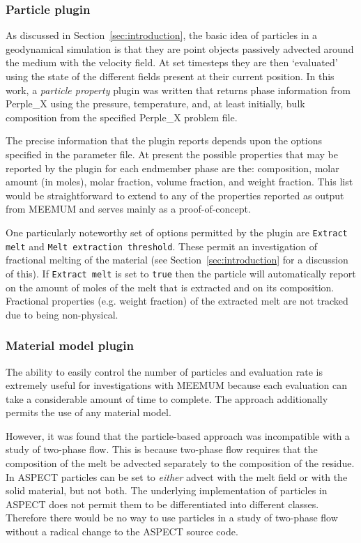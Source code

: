 \subsubsection{Particle plugin}

As discussed in Section~\ref{sec:introduction}, the basic idea of particles in a geodynamical simulation is that they are point objects passively advected around the medium with the velocity field.
At set timesteps they are then `evaluated' using the state of the different fields present at their current position.
In this work, a \textit{particle property} plugin was written that returns phase information from Perple\_X using the pressure, temperature, and, at least initially, bulk composition from the specified Perple\_X problem file.

The precise information that the plugin reports depends upon the options specified in the parameter file.
At present the possible properties that may be reported by the plugin for each endmember phase are the: composition, molar amount (in moles), molar fraction, volume fraction, and weight fraction.
This list would be straightforward to extend to any of the properties reported as output from MEEMUM and serves mainly as a proof-of-concept.

One particularly noteworthy set of options permitted by the plugin are \texttt{Extract melt} and \texttt{Melt extraction threshold}.
These permit an investigation of fractional melting of the material (see Section~\ref{sec:introduction} for a discussion of this).
If \texttt{Extract melt} is set to \texttt{true} then the particle will automatically report on the amount of moles of the melt that is extracted and on its composition.
Fractional properties (e.g. weight fraction) of the extracted melt are not tracked due to being non-physical.

\subsubsection{Material model plugin}

The ability to easily control the number of particles and evaluation rate is extremely useful for investigations with MEEMUM because each evaluation can take a considerable amount of time to complete.
The approach additionally permits the use of any material model.

However, it was found that the particle-based approach was incompatible with a study of two-phase flow.
This is because two-phase flow requires that the composition of the melt be advected separately to the composition of the residue.
In ASPECT particles can be set to \textit{either} advect with the melt field or with the solid material, but not both.
The underlying implementation of particles in ASPECT does not permit them to be differentiated into different classes.
Therefore there would be no way to use particles in a study of two-phase flow without a radical change to the ASPECT source code.

